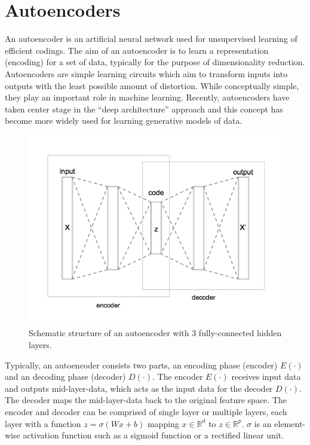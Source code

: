 \documentclass[12pt]{report} %
\begin{document}
\section{Autoencoders}
An autoencoder is an artificial neural network used for unsupervised learning of efficient codings. The aim of an autoencoder is to learn a representation (encoding) for a set of data, typically for the purpose of dimensionality reduction. Autoencoders are simple learning circuits which aim to transform inputs into outputs with the least possible amount of distortion. While conceptually simple, they play an important role in machine learning. Recently, autoencoders have taken center stage in the “deep architecture” approach and this concept has become more widely used for learning generative models of data\cite{AE, AE3}.

\begin{figure}[H]
	\centering
	\includegraphics[scale=0.6]{pictures/Autoencoder_structure.png}
	\caption{Schematic structure of an autoencoder with 3 fully-connected hidden layers\cite{AEPIC}.}
	\label{fig:3}
\end{figure}
Typically, an autoencoder consists two parts, an encoding phase (encoder) \(E(\cdot)\) and an decoding phase (decoder) \(D(\cdot)\). The encoder \(E(\cdot)\) receives input data and outputs mid-layer-data, which acts as the input data for the decoder \(D(\cdot)\). The decoder maps the mid-layer-data back to the original feature space. The encoder and decoder can be comprised of single layer or multiple layers, each layer with a function \(z=\sigma(Wx+b)\) mapping \(x\in \mathbb{R}^{d}\) to \(z\in \mathbb{R}^{p}\).  \(\sigma\) is an element-wise activation function such as a sigmoid function or a rectified linear unit. 
\end{document}
